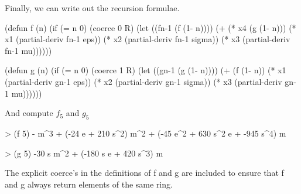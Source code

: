 Finally, we can write out the recursion formulae.

\begin{code}
(defun f (n) 
  (if (= n 0) (coerce 0 R)
    (let ((fn-1 (f (1- n))))
      (+ (* x4 (g (1- n)))
         (* x1 (partial-deriv fn-1 eps))
         (* x2 (partial-deriv fn-1 sigma))
         (* x3 (partial-deriv fn-1 mu))))))
\end{code}

\begin{code}
(defun g (n)
  (if (= n 0) (coerce 1 R)
    (let ((gn-1 (g (1- n))))
      (+ (f (1- n)) 
         (* x1 (partial-deriv gn-1 eps))
         (* x2 (partial-deriv gn-1 sigma))
         (* x3 (partial-deriv gn-1 mu))))))
\end{code}

And compute $f_5$ and $g_5$
\begin{code}
> (f 5)
- m^3 + (-24 e + 210 s^2) m^2 + (-45 e^2 + 630 s^2 e + -945 s^4) m

> (g 5)
-30 s m^2 + (-180 s e + 420 s^3) m
\end{code}

The explicit {\sf coerce}'s in the definitions of {\sf f} and {\sf g}
are included to ensure that {\sf f} and {\sf g} always return elements
of the same ring.

